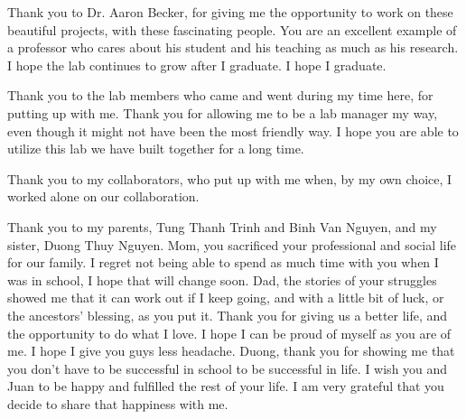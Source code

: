 

Thank you to Dr. Aaron Becker, for giving me the opportunity to work on these beautiful projects, with these fascinating people.
You are an excellent example of a professor who cares about his student and his teaching as much as his research.
I hope the lab continues to grow after I graduate.
I hope I graduate.

Thank you to the lab members who came and went during my time here, for putting up with me.
Thank you for allowing me to be a lab manager my way, even though it might not have been the most friendly way.
I hope you are able to utilize this lab we have built together for a long time.

Thank you to my collaborators, who put up with me when, by my own choice, I worked alone on our collaboration.

Thank you to my parents, Tung Thanh Trinh and Binh Van Nguyen, and my sister, Duong Thuy Nguyen.
Mom, you sacrificed your professional and social life for our family.
I regret not being able to spend as much time with you when I was in school, I hope that will change soon.
Dad, the stories of your struggles showed me that it can work out if I keep going, and with a little bit of luck, or the ancestors' blessing, as you put it.
Thank you for giving us a better life, and the opportunity to do what I love.
I hope I can be proud of myself as you are of me.
I hope I give you guys less headache.
Duong, thank you for showing me that you don't have to be successful in school to be successful in life.
I wish you and Juan to be happy and fulfilled the rest of your life.
I am very grateful that you decide to share that happiness with me.
